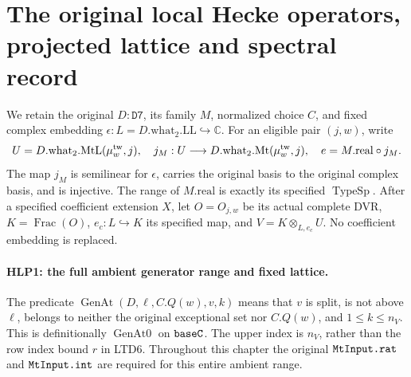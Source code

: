 \section{The original local Hecke operators, projected lattice and spectral record}
\label{sec:local-hecke-projection}


We retain the original \(D:\texttt{D7}\), its family \(M\), normalized
choice \(C\), and fixed complex embedding
\(\epsilon:L=D.\mathrm{what}_2.\mathrm{LL}\hookrightarrow\mathbb C\).
For an eligible pair \((j,w)\), write
\[
 U=D.\mathrm{what}_2.\mathrm{MtL}(\mu^{\rm tw}_w,j),\quad
 j_M:U\longrightarrow D.\mathrm{what}_2.\mathrm{Mt}(\mu^{\rm tw}_w,j),
 \quad e=M.\mathrm{real}\circ j_M.
\]
The map \(j_M\) is semilinear for \(\epsilon\), carries the original
basis to the original complex basis, and is injective. The range of
\(M.\mathrm{real}\) is exactly its specified \(\operatorname{TypeSp}\).
After a specified coefficient extension \(X\), let \(O=O_{j,w}\) be its
actual complete DVR, \(K=\operatorname{Frac}(O)\),
\(e_c:L\hookrightarrow K\) its specified map, and
\(V=K\otimes_{L,e_c}U\). No coefficient embedding is replaced.

\paragraph{HLP1: the full ambient generator range and fixed lattice.}
\label{claim:HLP1}
The predicate \(\operatorname{GenAt}(D,\ell,C.Q(w),v,k)\) means that
\(v\) is split, is not above \(\ell\), belongs to neither the original
exceptional set nor \(C.Q(w)\), and \(1\le k\le n_V\).
This is definitionally \(\operatorname{GenAt0}\) on \(\texttt{base\allowbreak C}\).
The upper index is \(n_V\), rather than the row index bound \(r\) in
LTD6. Throughout this chapter the original \(\texttt{Mt\allowbreak Input.rat}\) and
\(\texttt{Mt\allowbreak Input.int}\) are required for this entire ambient range.

